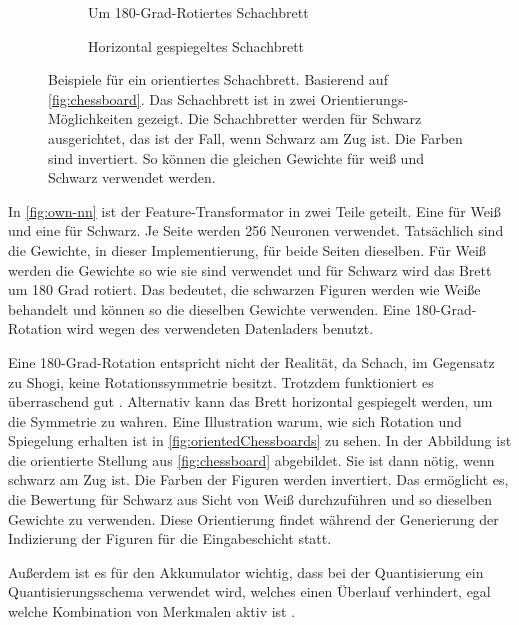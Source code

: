 \begin{figure}
  \centering
  \begin{subfigure}{.5\textwidth}
    \centering
    \resizebox{.9\textwidth}{!}{%
      \chessboard[setfen={8/8/6k1/5N2/3p4/8/3K4/8 b}]
    }
    \caption{Um 180-Grad-Rotiertes Schachbrett}
    \label{fig:rotatedChessboard}
  \end{subfigure}%
  \begin{subfigure}{.5\textwidth}
    \centering
    \resizebox{.9\textwidth}{!}{%
      \chessboard[setfen={8/8/1k6/2N5/4p3/8/4K3/8 b}]
    }
    \caption{Horizontal gespiegeltes Schachbrett}
    \label{fig:flippedChessboard}
  \end{subfigure}
  \caption{Beispiele für ein orientiertes Schachbrett. Basierend auf \autoref{fig:chessboard}. Das Schachbrett ist in zwei Orientierungs-Möglichkeiten gezeigt. Die Schachbretter werden für Schwarz ausgerichtet, das ist der Fall, wenn Schwarz am Zug ist. Die Farben sind invertiert. So können die gleichen Gewichte für weiß und Schwarz verwendet werden.}
  \label{fig:orientedChessboards}
\end{figure}

In \autoref{fig:own-nn} ist der Feature-Transformator in zwei Teile geteilt. Eine für Weiß und eine für Schwarz. Je Seite werden 256 Neuronen verwendet. Tatsächlich sind die Gewichte, in dieser Implementierung, für beide Seiten dieselben. Für Weiß werden die Gewichte so wie sie sind verwendet und für Schwarz wird das Brett um 180 Grad rotiert. Das bedeutet, die schwarzen Figuren werden wie Weiße behandelt und können so die dieselben Gewichte verwenden. Eine 180-Grad-Rotation wird wegen des verwendeten Datenladers benutzt.

Eine 180-Grad-Rotation entspricht nicht der Realität, da Schach, im Gegensatz zu Shogi, keine Rotationssymmetrie besitzt. Trotzdem funktioniert es überraschend gut \cite{StockfishNNUE}. Alternativ kann das Brett horizontal gespiegelt werden, um die Symmetrie zu wahren. Eine Illustration warum, wie sich Rotation und Spiegelung erhalten ist in \autoref{fig:orientedChessboards} zu sehen. In der Abbildung ist die orientierte Stellung aus \autoref{fig:chessboard} abgebildet. Sie ist dann nötig, wenn schwarz am Zug ist. Die Farben der Figuren werden invertiert. Das ermöglicht es, die Bewertung für Schwarz aus Sicht von Weiß durchzuführen und so dieselben Gewichte zu verwenden. Diese Orientierung findet während der Generierung der Indizierung der Figuren für die Eingabeschicht statt.

Außerdem ist es für den Akkumulator wichtig, dass bei der Quantisierung ein Quantisierungsschema verwendet wird, welches einen Überlauf verhindert, egal welche Kombination von Merkmalen aktiv ist \cite{StockfishNNUE}.

